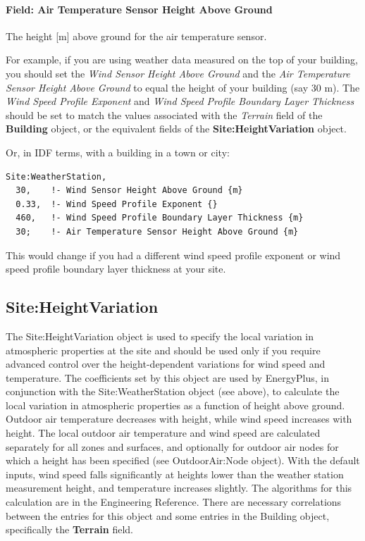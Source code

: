 \paragraph{Field: Air Temperature Sensor Height Above Ground}\label{field-air-temperature-sensor-height-above-ground}

The height {[}m{]} above ground for the air temperature sensor.

For example, if you are using weather data measured on the top of your building, you should set the \emph{Wind Sensor Height Above Ground} and the \emph{Air Temperature Sensor Height Above Ground} to equal the height of your building (say 30 m). The \emph{Wind Speed Profile Exponent} and \emph{Wind Speed Profile Boundary Layer Thickness} should be set to match the values associated with the \emph{Terrain} field of the \textbf{Building} object, or the equivalent fields of the \textbf{Site:HeightVariation} object.

Or, in IDF terms, with a building in a town or city:

\begin{lstlisting}
Site:WeatherStation,
  30,    !- Wind Sensor Height Above Ground {m}
  0.33,  !- Wind Speed Profile Exponent {}
  460,   !- Wind Speed Profile Boundary Layer Thickness {m}
  30;    !- Air Temperature Sensor Height Above Ground {m}
\end{lstlisting}

This would change if you had a different wind speed profile exponent or wind speed profile boundary layer thickness at your site.

\subsection{Site:HeightVariation}\label{siteheightvariation}

The Site:HeightVariation object is used to specify the local variation in atmospheric properties at the site and should be used only if you require advanced control over the height-dependent variations for wind speed and temperature. The coefficients set by this object are used by EnergyPlus, in conjunction with the Site:WeatherStation object (see above), to calculate the local variation in atmospheric properties as a function of height above ground. Outdoor air temperature decreases with height, while wind speed increases with height. The local outdoor air temperature and wind speed are calculated separately for all zones and surfaces, and optionally for outdoor air nodes for which a height has been specified (see OutdoorAir:Node object). With the default inputs, wind speed falls significantly at heights lower than the weather station measurement height, and temperature increases slightly. The algorithms for this calculation are in the Engineering Reference. There are necessary correlations between the entries for this object and some entries in the Building object, specifically the \textbf{Terrain} field.

